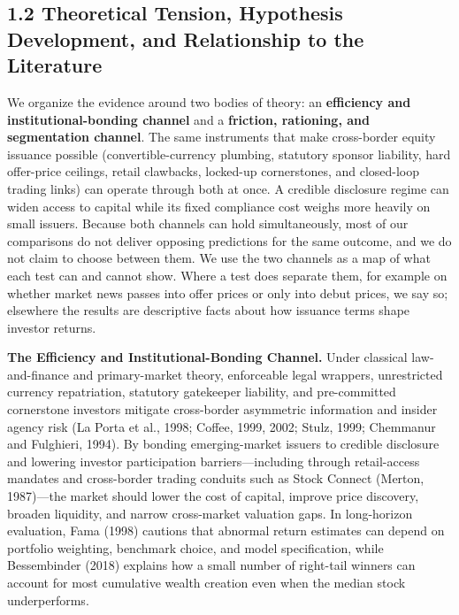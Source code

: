 \documentclass[11pt,letterpaper]{article}
\begin{document}
\subsection*{\texorpdfstring{1.2 Theoretical Tension, Hypothesis Development, and Relationship to the Literature}{1.2 Theoretical Tension, Hypothesis Development, and Relationship to the Literature}}
We organize the evidence around two bodies of theory: an \textbf{efficiency and institutional-bonding channel} and a \textbf{friction, rationing, and segmentation channel}. The same instruments that make cross-border equity issuance possible (convertible-currency plumbing, statutory sponsor liability, hard offer-price ceilings, retail clawbacks, locked-up cornerstones, and closed-loop trading links) can operate through both at once. A credible disclosure regime can widen access to capital while its fixed compliance cost weighs more heavily on small issuers. Because both channels can hold simultaneously, most of our comparisons do not deliver opposing predictions for the same outcome, and we do not claim to choose between them. We use the two channels as a map of what each test can and cannot show. Where a test does separate them, for example on whether market news passes into offer prices or only into debut prices, we say so; elsewhere the results are descriptive facts about how issuance terms shape investor returns.

\textbf{The Efficiency and Institutional-Bonding Channel.} Under classical law-and-finance and primary-market theory, enforceable legal wrappers, unrestricted currency repatriation, statutory gatekeeper liability, and pre-committed cornerstone investors mitigate cross-border asymmetric information and insider agency risk (La Porta et al., 1998; Coffee, 1999, 2002; Stulz, 1999; Chemmanur and Fulghieri, 1994). By bonding emerging-market issuers to credible disclosure and lowering investor participation barriers—including through retail-access mandates and cross-border trading conduits such as Stock Connect (Merton, 1987)—the market should lower the cost of capital, improve price discovery, broaden liquidity, and narrow cross-market valuation gaps. In long-horizon evaluation, Fama (1998) cautions that abnormal return estimates can depend on portfolio weighting, benchmark choice, and model specification, while Bessembinder (2018) explains how a small number of right-tail winners can account for most cumulative wealth creation even when the median stock underperforms.
\end{document}
